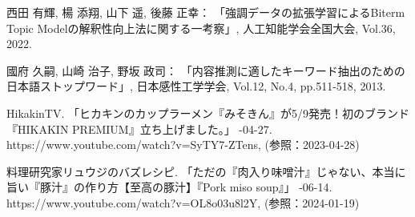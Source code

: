 \documentclass{ltjarticle}
\begin{document}
\begin{thebibliography}{99}
    西田 有輝, 楊 添翔, 山下 遥, 後藤 正幸：
    \newblock 「強調データの拡張学習によるBiterm Topic Modelの解釈性向上法に関する一考察」,
    \newblock 人工知能学会全国大会, Vol.36, 2022.

    國府 久嗣, 山崎 治子, 野坂 政司：
    \newblock 「内容推測に適したキーワード抽出のための日本語ストップワード」,
    \newblock 日本感性工学学会, Vol.12, No.4, pp.511-518, 2013.

    HikakinTV. 「ヒカキンのカップラーメン『みそきん』が5/9発売！初のブランド『HIKAKIN PREMIUM』立ち上げました。」
    -04-27. 
    \newblock https://www.youtube.com/watch?v=SyTY7-ZTens, (参照：2023-04-28)

    料理研究家リュウジのバズレシピ. 「ただの『肉入り味噌汁』じゃない、本当に旨い『豚汁』の作り方【至高の豚汁】『Pork miso soup』」
    -06-14. 
    \newblock https://www.youtube.com/watch?v=OL8o03u8l2Y,  (参照：2024-01-19)
     
\end{thebibliography}
\end{document}
